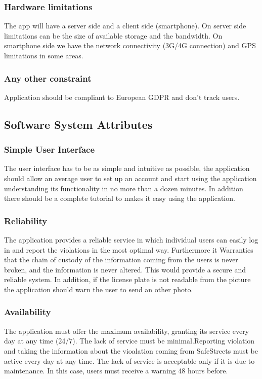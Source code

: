 \begin{enumerate}
\begin{itemize}
\subsubsection{Hardware limitations}
The app will have a server side and a client side (smartphone).
On server side limitations can be the size of available storage and the bandwidth.
On smartphone side we have the network connectivity (3G/4G connection) and GPS limitations in some areas.

\subsubsection{Any other constraint}
Application should be compliant to European GDPR and don't track users.

\subsection{Software System Attributes} %
\subsubsection{Simple User Interface}
The user interface has to be as simple and intuitive as possible, the application should allow an average user to set up an account and start using the application understanding its functionality in no more than a dozen minutes. In addition there should be a complete tutorial to makes it easy using the application.

\subsubsection{Reliability}
The application provides a reliable service in which individual users can easily log in and report the violations in the most optimal way. Furthermore it Warranties that the chain of custody of the information coming from the users is never broken, and the information is never altered. This would provide a secure and reliable system. In addition, if the license plate	is not readable from the picture the application should warn the user to send an other photo.
\subsubsection{Availability}
The application must offer the maximum availability, granting its service every day at any time (24/7). The lack of service must be minimal.Reporting violation and taking the information about the vioalation coming from SafeStreets must be active every day at any time. The lack of service is acceptable only if it is due to maintenance. In this case, users must receive a warning 48 hours before.

\end{itemize}
\end{enumerate}
